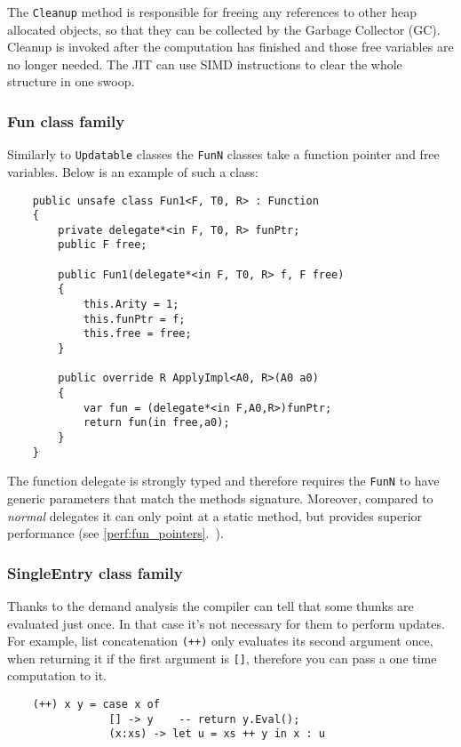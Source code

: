 \documentclass[en]{pracamgr}
\newcommand{\myref}[1]{\ref{#1}.~\textit{\nameref{#1}}}
\begin{document}
The \texttt{Cleanup} method is responsible for freeing
any references to other heap allocated objects, so that
they can be collected by the Garbage Collector (GC).
Cleanup is invoked after the computation has finished
and those free variables are no longer needed.
The JIT can use SIMD instructions to clear the whole
structure in one swoop.

\subsubsection{Fun class family}

Similarly to \texttt{Updatable} classes the \texttt{FunN}
classes take a function pointer and free variables.
Below is an example of such a class:

\begin{verbatim}
    public unsafe class Fun1<F, T0, R> : Function
    {
        private delegate*<in F, T0, R> funPtr;
        public F free;

        public Fun1(delegate*<in F, T0, R> f, F free)
        {
            this.Arity = 1;
            this.funPtr = f;
            this.free = free;
        }

        public override R ApplyImpl<A0, R>(A0 a0)
        {
            var fun = (delegate*<in F,A0,R>)funPtr;
            return fun(in free,a0);
        }
    }
\end{verbatim}

The function delegate is strongly typed and therefore
requires the \texttt{FunN} to have generic parameters
that match the methods signature. Moreover, compared
to \textit{normal} delegates it can only point at a
static method, but provides superior performance (see \myref{perf:fun_pointers}).

\subsubsection{SingleEntry class family}

Thanks to the demand analysis \cite{demand analysis} the compiler can
tell that some thunks are evaluated just once.
In that case it's not necessary for them to perform updates.
For example, list concatenation \texttt{(++)} only evaluates its
second argument once, when returning it if the first argument is \texttt{[]},
therefore you can pass a one time computation to it.

\begin{verbatim}
    (++) x y = case x of
                [] -> y    -- return y.Eval();
                (x:xs) -> let u = xs ++ y in x : u
\end{verbatim}
\end{document}
